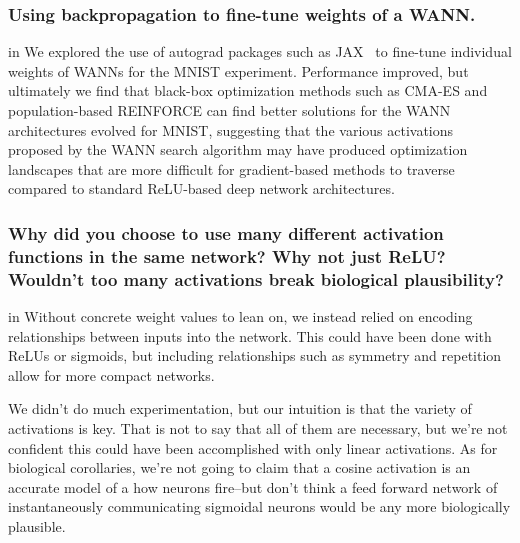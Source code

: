 \subsubsection{Using backpropagation to fine-tune weights of a WANN.}
 in
We explored the use of autograd packages such as JAX~\cite{jax_library} to fine-tune individual weights of WANNs for the MNIST experiment. Performance improved, but ultimately we find that black-box optimization methods such as CMA-ES and population-based REINFORCE can find better solutions for the WANN architectures evolved for MNIST, suggesting that the various activations proposed by the WANN search algorithm may have produced optimization landscapes that are more difficult for gradient-based methods to traverse compared to standard ReLU-based deep network architectures.

\subsubsection{Why did you choose to use many different activation functions in the same network? Why not just ReLU? Wouldn't too many activations break biological plausibility?}
 in
Without concrete weight values to lean on, we instead relied on encoding relationships between inputs into the network. This could have been done with ReLUs or sigmoids, but including relationships such as symmetry and repetition allow for more compact networks.

We didn't do much experimentation, but our intuition is that the variety of activations is key. That is not to say that all of them are necessary, but we're not confident this could have been accomplished with only linear activations. As for biological corollaries, we're not going to claim that a cosine activation is an accurate model of a how neurons fire--but don't think a feed forward network of instantaneously communicating sigmoidal neurons would be any more biologically plausible.

